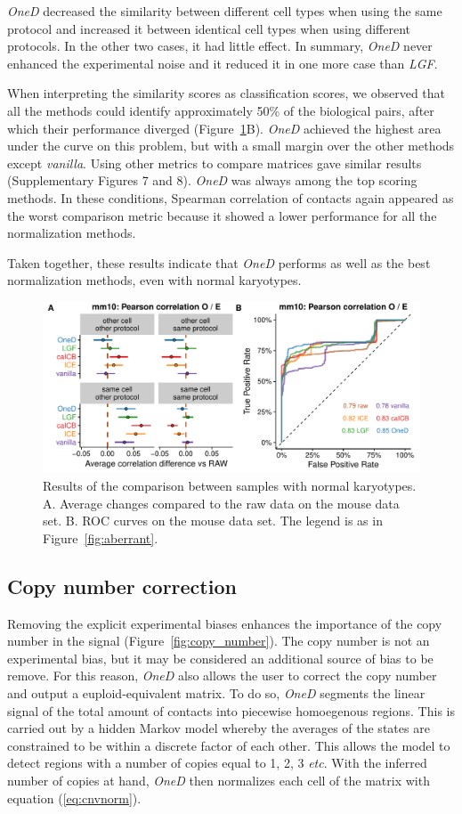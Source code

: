 \documentclass{bioinfo}
\begin{document}
\textit{OneD} decreased the similarity between different cell types when
using the same protocol and increased it between identical cell types when
using different protocols. In the other two cases, it had little effect.
In summary, \textit{OneD} never enhanced the experimental noise and it
reduced it in one more case than \textit{LGF}.

When interpreting the similarity scores as classification scores, we
observed that all the methods could identify approximately 50\% of the
biological pairs, after which their performance diverged
(Figure~\ref{fig:normal}B). \textit{OneD} achieved the highest area under
the curve on this problem, but with a small margin over the other methods
except \textit{vanilla}. Using other metrics to compare matrices gave
similar results (Supplementary Figures 7 and 8). \textit{OneD} was always
among the top scoring methods. In these conditions, Spearman correlation
of contacts again appeared as the worst comparison metric because it
showed a lower performance for all the normalization methods.

Taken together, these results indicate that \textit{OneD} performs as well
as the best normalization methods, even with normal karyotypes.

\begin{figure}
\centerline{\includegraphics[width=.50\textwidth]
  {img/correlation_normal_figure4.pdf}}
\caption{
Results of the comparison between samples with normal karyotypes. A.
Average changes compared to the raw data on the mouse data set.  B. ROC
curves on the mouse data set. The legend is as in
Figure~\ref{fig:aberrant}.}
\label{fig:normal}
\end{figure}



\subsection{Copy number correction}

Removing the explicit experimental biases enhances the importance of the
copy number in the signal (Figure~\ref{fig:copy_number}). The copy number
is not an experimental bias, but it may be considered an additional source
of bias to be remove. For this reason, \textit{OneD} also allows the user
to correct the copy number and output a euploid-equivalent matrix. To do
so, \textit{OneD} segments the linear signal of the total amount of
contacts into piecewise homoegenous regions. This is carried out by a
hidden Markov model whereby the averages of the states are constrained to
be within a discrete factor of each other. This allows the model to detect
regions with a number of copies equal to 1, 2, 3 \textit{etc}. With the
inferred number of copies at hand, \textit{OneD} then normalizes each cell
of the matrix with equation (\ref{eq:cnvnorm}).
\end{document}
